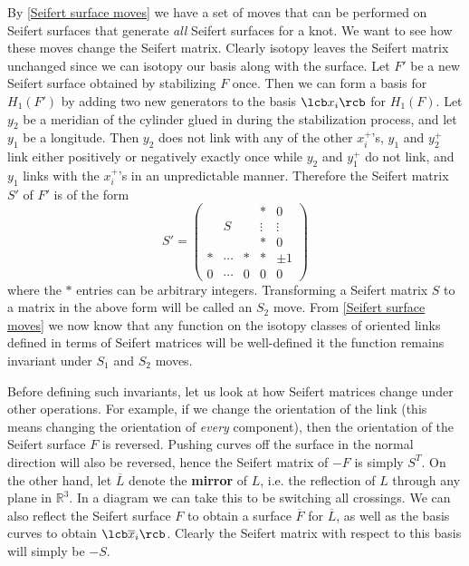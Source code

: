 By \cref{Seifert surface moves} we have a set of moves that can be performed on Seifert surfaces that generate \emph{all} Seifert surfaces for a knot. We want to see how these moves change the Seifert matrix. Clearly isotopy leaves the Seifert matrix unchanged since we can isotopy our basis along with the surface. Let $F'$ be a new Seifert surface obtained by stabilizing $F$ once. Then we can form a basis for $H_1(F')$ by adding two new generators to the basis $\lcb x_i \rcb$ for $H_1(F)$. Let $y_2$ be a meridian of the cylinder glued in during the stabilization process, and let $y_1$ be a longitude. Then $y_2$ does not link with any of the other $x_i^+$'s, $y_1$ and $y_2^+$ link either positively or negatively exactly once while $y_2$ and $y_1^+$ do not link, and $y_1$ links with the $x_i^+$'s in an unpredictable manner. Therefore the Seifert matrix $S'$ of $F'$ is of the form
\begin{equation}
\label{S_2 move}
S' = \begin{pmatrix} & & & * & 0 \\ & S & & \vdots & \vdots \\ & & & * & 0 \\ * & \cdots & * & * & \pm 1 \\ 0 & \cdots & 0 & 0 & 0 \end{pmatrix}
\end{equation}
where the $*$ entries can be arbitrary integers. Transforming a Seifert matrix $S$ to a matrix in the above form will be called an $S_2$ move. From \cref{Seifert surface moves} we now know that any function on the isotopy classes of oriented links defined in terms of Seifert matrices will be well-defined it the function remains invariant under $S_1$ and $S_2$ moves.

Before defining such invariants, let us look at how Seifert matrices change under other operations. For example, if we change the orientation of the link (this means changing the orientation of \emph{every} component), then the orientation of the Seifert surface $F$ is reversed. Pushing curves off the surface in the normal direction will also be reversed, hence the Seifert matrix of $-F$ is simply $S^T$. On the other hand, let $\overline L$ denote the \textbf{mirror} of $L$, i.e. the reflection of $L$ through any plane in $\mathbb R^3$. In a diagram we can take this to be switching all crossings. We can also reflect the Seifert surface $F$ to obtain a surface $\overline F$ for $\overline L$, as well as the basis curves to obtain $\lcb \overline x_i \rcb$. Clearly the Seifert matrix with respect to this basis will simply be $-S$.

